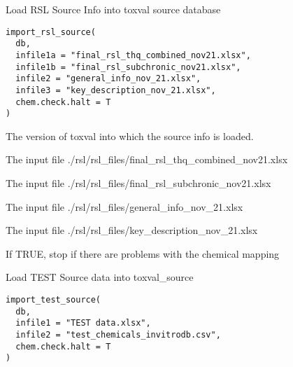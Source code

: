 \documentclass[letterpaper]{book}
\begin{document}
%
\begin{Description}\relax
Load RSL Source Info into toxval source database
\end{Description}
%
\begin{Usage}
\begin{verbatim}
import_rsl_source(
  db,
  infile1a = "final_rsl_thq_combined_nov21.xlsx",
  infile1b = "final_rsl_subchronic_nov21.xlsx",
  infile2 = "general_info_nov_21.xlsx",
  infile3 = "key_description_nov_21.xlsx",
  chem.check.halt = T
)
\end{verbatim}
\end{Usage}
%
\begin{Arguments}
\begin{ldescription}
\item[\code{db}] The version of toxval into which the source info is loaded.

\item[\code{infile1a}] The input file ./rsl/rsl\_files/final\_rsl\_thq\_combined\_nov21.xlsx

\item[\code{infile1b}] The input file ./rsl/rsl\_files/final\_rsl\_subchronic\_nov21.xlsx

\item[\code{infile2}] The input file ./rsl/rsl\_files/general\_info\_nov\_21.xlsx

\item[\code{infile3}] The input file ./rsl/rsl\_files/key\_description\_nov\_21.xlsx

\item[\code{chem.check.halt}] If TRUE, stop if there are problems with the chemical mapping
\end{ldescription}
\end{Arguments}
%
\begin{Description}\relax
Load TEST Source data into toxval\_source
\end{Description}
%
\begin{Usage}
\begin{verbatim}
import_test_source(
  db,
  infile1 = "TEST data.xlsx",
  infile2 = "test_chemicals_invitrodb.csv",
  chem.check.halt = T
)
\end{verbatim}
\end{Usage}
%
\end{document}
